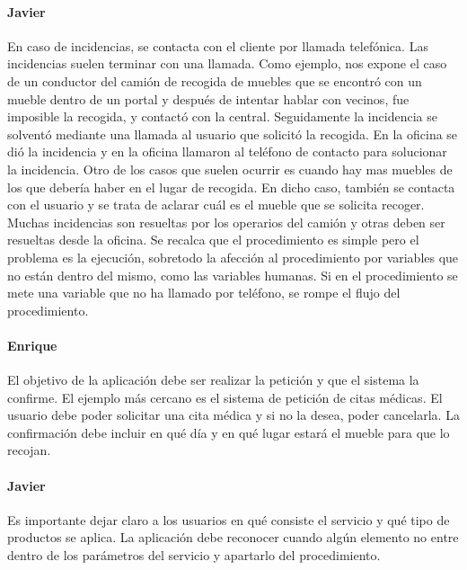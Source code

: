 \paragraph{Javier} En caso de incidencias, se contacta con el cliente por llamada telefónica. Las incidencias suelen terminar con una llamada. Como ejemplo, nos expone el caso de un conductor del camión de recogida de muebles que se encontró con un mueble dentro de un portal y después de intentar hablar con vecinos, fue imposible la recogida, y contactó con la central. Seguidamente la incidencia se solventó mediante una llamada al usuario que solicitó la recogida. En la oficina se dió la incidencia y en la oficina llamaron al teléfono de contacto para solucionar la incidencia. Otro de los casos que suelen ocurrir es cuando hay mas muebles de los que debería haber en el lugar de recogida. En dicho caso, también se contacta con el usuario y se trata de aclarar cuál es el mueble que se solicita recoger. Muchas incidencias son resueltas por los operarios del camión y otras deben ser resueltas desde la oficina. Se recalca que el procedimiento es simple pero el problema es la ejecución, sobretodo la afección al procedimiento por variables que no están dentro del mismo, como las variables humanas. Si en el procedimiento se mete una variable que no ha llamado por teléfono, se rompe el flujo del procedimiento.
 
\paragraph{Enrique} El objetivo de la aplicación debe ser realizar la petición y que el sistema la confirme. El ejemplo más cercano es el sistema de petición de citas médicas. El usuario debe poder solicitar una cita médica y si no la desea, poder cancelarla. La confirmación debe incluir en qué día y en qué lugar estará el mueble para que lo recojan.
 
\paragraph{Javier} Es importante dejar claro a los usuarios en qué consiste el servicio y qué tipo de productos se aplica. La aplicación debe reconocer cuando algún elemento no entre dentro de los parámetros del servicio y apartarlo del procedimiento.
 
